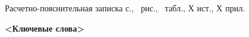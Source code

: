 	\begin{center}
    	Расчетно-пояснительная записка \pageref{LastPage} с., \totalfigures\ рис., \totaltables\ табл., Х ист., Х прил.
    	
		\textbf{<Ключевые слова>}
	\end{center}
\pagebreak